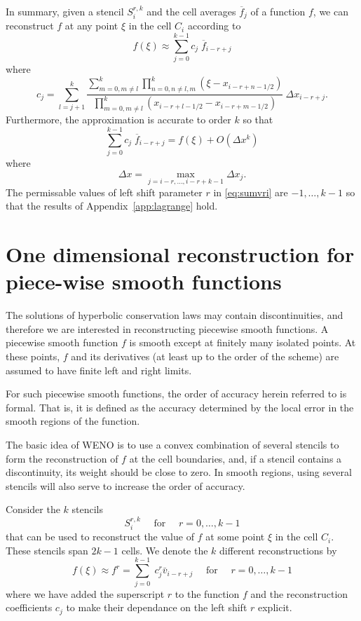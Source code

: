 \documentclass{article}
\newcommand{\for}[0]{\quad \text{ for } \quad}
\numberwithin{equation}{section}
\begin{document}
In summary, given a stencil $S_i^{r,k}$ and the cell averages
$\overline{f}_j$ of a function $f$, we can reconstruct $f$ at any
point $\xi$ in the cell $C_i$ according to
\begin{equation}
  \label{eq:sumvri}
  f(\xi) \approx \sum_{j=0}^{k-1} c_j\; \overline{f}_{i-r+j}
\end{equation}
where
\begin{equation}
  c_j = \sum_{l=j+1}^k \frac{\sum_{m=0, m \neq l}^{k}
    \prod_{n=0, n \neq l,m}^{k} (\xi - x_{i-r+n-1/2})}{
    \prod_{m=0, m \neq l}^{k} (x_{i-r+l-1/2} - x_{i-r+m-1/2})}
  \ \Delta x_{i-r+j}.
\end{equation}
Furthermore, the approximation is accurate to order $k$ so that
\begin{equation*}
  \sum_{j=0}^{k-1} c_j\; \overline{f}_{i-r+j} = f(\xi) + O(\Delta x^k)
\end{equation*}
where
\begin{equation*}
  \Delta x = \max_{j=i-r,\ldots,i-r+k-1} \Delta x_j.
\end{equation*}
The permissable values of left shift parameter $r$ in
\eqref{eq:sumvri} are $-1,\ldots,k-1$ so that the results of
Appendix~\ref{app:lagrange} hold.

\newpage
\section{One dimensional reconstruction for piece-wise smooth functions}

The solutions of hyperbolic conservation laws may contain
discontinuities, and therefore we are interested in reconstructing
piecewise smooth functions.  A piecewise smooth function $f$ is smooth
except at finitely many isolated points.  At these points, $f$ and its
derivatives (at least up to the order of the scheme) are assumed to
have finite left and right limits.

For such piecewise smooth functions, the order of accuracy herein
referred to is formal.  That is, it is defined as the accuracy
determined by the local error in the smooth regions of the function.

The basic idea of WENO is to use a convex combination of several
stencils to form the reconstruction of $f$ at the cell boundaries,
and, if a stencil contains a discontinuity, its weight should be close
to zero.  In smooth regions, using several stencils will also serve to
increase the order of accuracy.

Consider the $k$ stencils
\begin{equation*}
  S_i^{r,k} \for r=0,\ldots,k-1
\end{equation*}
that can be used to reconstruct the value of $f$ at some point $\xi$
in the cell $C_i$.  These stencils span $2k-1$ cells.  We denote the
$k$ different reconstructions by
\begin{equation}
  \label{eq:fr}
  f(\xi) \approx f^r = \sum_{j=0}^{k-1}\; c^r_j \bar{v}_{i-r+j} \for r=0,\dots,k-1
\end{equation}
where we have added the superscript $r$ to the function $f$ and the
reconstruction coefficients $c_j$ to make their dependance on the left
shift $r$ explicit.
\end{document}
